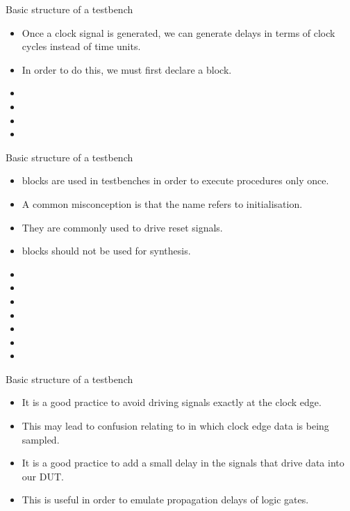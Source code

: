 %
\begin{frame}{Basic structure of a testbench}{}
\begin{itemize}
\item Once a clock signal is generated, we can generate delays in terms of clock cycles instead of time units.
\item In order to do this, we must first declare a  block.
\item[]  
\item[] 
\item {}
\item {}
\end{itemize}
\end{frame}


%
\begin{frame}{Basic structure of a testbench}{}
\begin{itemize}
\item {} blocks are used in testbenches in order to execute procedures only once.
\item A common misconception is that the name  refers to initialisation.
\item They are commonly used to drive reset signals.
\item {} blocks should not be used for synthesis.
\item[] 
\item[] 
\item[] 
\item[] 
\item[] 
\item[] 
\item[] 
\end{itemize}
\end{frame}

%
\begin{frame}{Basic structure of a testbench}{}
\begin{itemize}
\item It is a good practice to avoid driving signals exactly at the clock edge.
\item This may lead to confusion relating to in which clock edge data is being sampled.
\item It is a good practice to add a small delay in the signals that drive data into our \ac{DUT}.
\item This is useful in order to emulate propagation delays of logic gates.
\end{itemize}
\end{frame}

